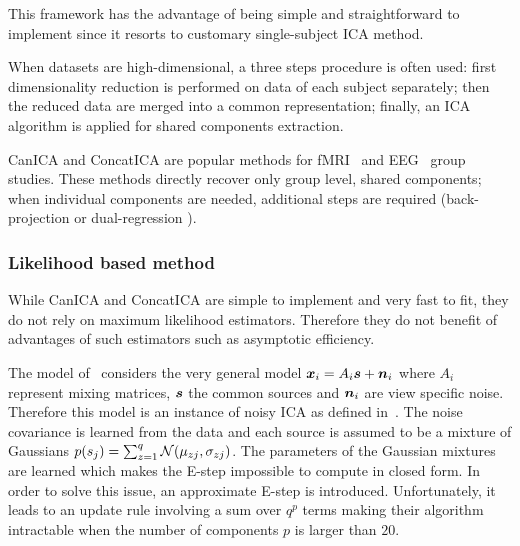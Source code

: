 This framework has the advantage of being simple and
straightforward to implement since it resorts to customary single-subject
ICA method.

When datasets are high-dimensional, a three steps procedure is often used: first
dimensionality reduction is performed on data of each subject  separately; then
the reduced data are merged into a common representation; finally, an ICA
algorithm is applied for shared components extraction.

CanICA and ConcatICA are popular methods for fMRI~\cite{calhoun2009review} and EEG~\cite{eichele2011eegift} group studies. These methods directly recover only group level, shared components; when individual components are needed, additional steps are required (back-projection \cite{calhoun2001method} or dual-regression \cite{beckmann2009group}).
% 

\subsubsection{Likelihood based method}
\label{sec:guo}
While CanICA and ConcatICA are simple to implement and very fast to fit, they do
not rely on maximum likelihood estimators. Therefore they do not benefit of
advantages of such estimators such as asymptotic efficiency.

The model of~\cite{guo2008unified} considers the very general model $\boldsymbol{x}_i =
A_i\boldsymbol{s} + \boldsymbol{n}_i$ where
$A_i$ represent mixing matrices, $\boldsymbol{s}$ the common sources and $\boldsymbol{n}_i$ are view
specific noise. Therefore this model is an instance of noisy ICA as defined
in~\cite{hyvarinen1999Gaussian}. The noise covariance is learned from the data
and each source is assumed to be a mixture of Gaussians
$p(s_j) = \sum_{z=1}^q \mathcal{N}(\mu_{zj}, \sigma_{zj})$. The parameters of the
Gaussian mixtures are learned which makes the E-step impossible to compute in closed form.
In order to solve this issue, an approximate E-step is introduced.
Unfortunately, it leads to an update rule involving a sum over $q^p$ terms making their algorithm intractable when the number of components $p$ is larger than $20$. 

